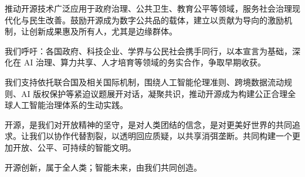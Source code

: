 推动开源技术广泛应用于政府治理、公共卫生、教育公平等领域，服务社会治理现代化与民生改善。鼓励开源成为数字公共品的载体，建立以贡献为导向的激励机制，让创新成果惠及所有人，尤其是边缘群体。

我们呼吁：各国政府、科技企业、学界与公民社会携手同行，以本宣言为基础，深化在 AI 治理、算力共享、人才培育等领域的务实合作，争取早期收获。

我们支持依托联合国及相关国际机制，围绕人工智能伦理准则、跨境数据流动规则、AI 版权保护等紧迫议题展开对话，凝聚共识，推动开源成为构建公正合理全球人工智能治理体系的生动实践。

开源，是我们对开放精神的坚守，是对人类团结的信念，是对更美好世界的共同追求。让我们以协作代替割裂，以透明回应质疑，以共享消弭垄断。共同构建一个更加开放、公平、可持续的智能文明。

开源创新，属于全人类；智能未来，由我们共同创造。

